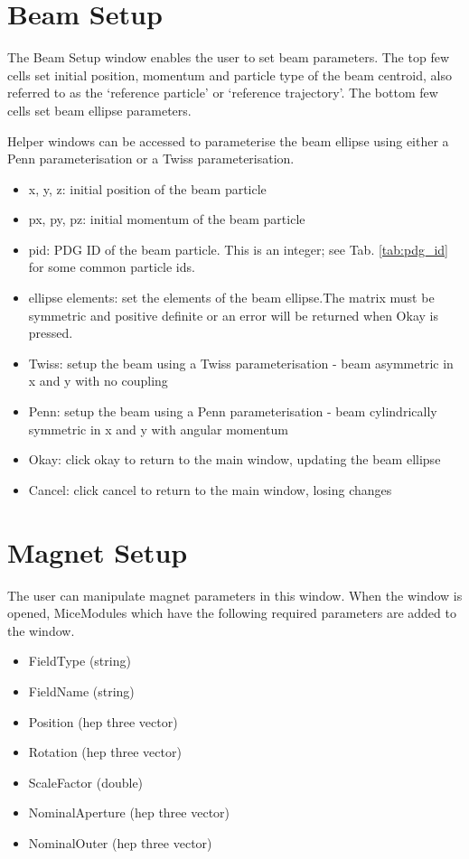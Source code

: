 \section{Beam Setup}

The Beam Setup window enables the user to set beam parameters. The top few cells
set initial position, momentum and particle type of the beam centroid, also
referred to as the `reference particle' or `reference trajectory'. The bottom
few cells set beam ellipse parameters.

Helper windows can be accessed to parameterise the beam ellipse using either a
Penn parameterisation or a
Twiss parameterisation.

\begin{itemize}
\item x, y, z: initial position of the beam particle
\item px, py, pz: initial momentum of the beam particle
\item pid: PDG ID of the beam particle. This is an integer; see Tab. 
\ref{tab:pdg_id} for some common particle ids.
\item ellipse elements: set the elements of the beam ellipse.The matrix must
be symmetric and positive definite or an error will be returned when Okay is
pressed.
\item Twiss: setup the beam using a Twiss parameterisation - beam asymmetric in
x and y with no coupling
\item Penn: setup the beam using a Penn parameterisation - beam cylindrically 
symmetric in x and y with angular momentum
\item Okay: click okay to return to the main window, updating the beam ellipse
\item Cancel: click cancel to return to the main window, losing changes
\end{itemize}

\section{Magnet Setup}
The user can manipulate magnet parameters in this window. When the window is
opened, MiceModules which have the following required parameters are added to
the window.

\begin{itemize}
\item FieldType (string)
\item FieldName (string)
\item Position (hep three vector)
\item Rotation (hep three vector)
\item ScaleFactor (double)
\item NominalAperture (hep three vector)
\item NominalOuter (hep three vector)
\end{itemize}

